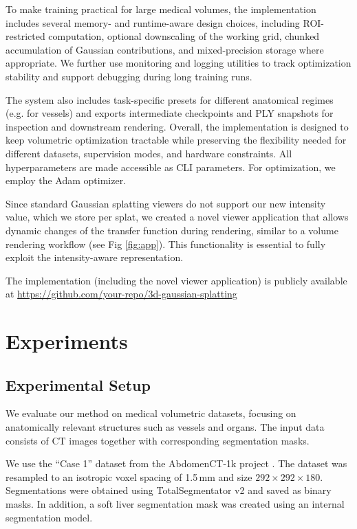 \documentclass[runningheads]{llncs}
\begin{document}
To make training practical for large medical volumes, the implementation includes several memory- and runtime-aware design choices, including ROI-restricted computation, optional downscaling of the working grid, chunked accumulation of Gaussian contributions, and mixed-precision storage where appropriate. We further use monitoring and logging utilities to track optimization stability and support debugging during long training runs.

The system also includes task-specific presets for different anatomical regimes (e.g. for vessels) and exports intermediate checkpoints and PLY snapshots for inspection and downstream rendering. Overall, the implementation is designed to keep volumetric optimization tractable while preserving the flexibility needed for different datasets, supervision modes, and hardware constraints. All hyperparameters are made accessible as CLI parameters. For optimization, we employ the Adam optimizer.

Since standard Gaussian splatting viewers do not support our new intensity value, which we store per splat, we created a novel viewer application that allows dynamic changes of the transfer function during rendering, similar to a volume rendering workflow (see Fig \ref{fig:app}). This functionality is essential to fully exploit the intensity-aware representation.

The implementation (including the novel viewer application) is publicly available at \url{https://github.com/your-repo/3d-gaussian-splatting}



\section{Experiments}

\subsection{Experimental Setup}
We evaluate our method on medical volumetric datasets, focusing on anatomically relevant structures such as vessels and organs. The input data consists of CT images together with corresponding segmentation masks.

We use the ``Case 1'' dataset from the AbdomenCT-1k project \cite{ma2021abdomenct}. The dataset was resampled to an isotropic voxel spacing of 1.5\,mm and size $292 \times 292 \times 180$. Segmentations were obtained using TotalSegmentator v2 and saved as binary masks. In addition, a soft liver segmentation mask was created using an internal segmentation model.
\end{document}
